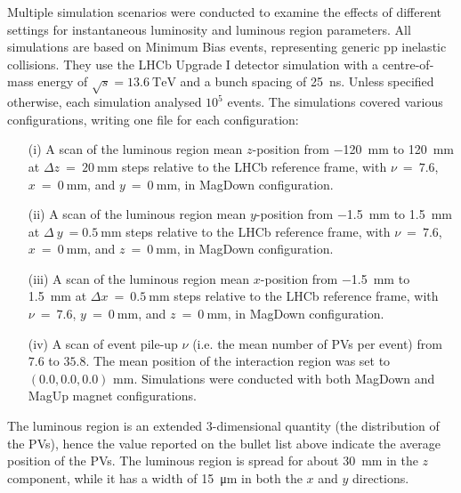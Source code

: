 Multiple simulation scenarios were conducted to examine the effects of different settings for instantaneous luminosity and luminous region parameters. All simulations are based on Minimum Bias events, representing generic pp inelastic collisions. They use the LHCb Upgrade I detector simulation with a centre-of-mass energy of $\sqrt{s} = \SI{13.6}{\tera\eV}$ and a bunch spacing of \SI{25}{\nano\second}. Unless specified otherwise, each simulation analysed $10^5$ events. The simulations covered various configurations, writing one file for each configuration:

\begin{enumerate}

    \item[(i)] A scan of the luminous region mean $z$-position from \SI{-120}{\milli\meter} to \SI{120}{\milli\meter} at $\Delta z~=~\SI{20}{\milli\meter}$ steps relative to the LHCb reference frame, with $\nu~=~7.6$, $x~=~\SI{0}{\milli\meter}$, and $y~=~\SI{0}{\milli\meter}$, in MagDown configuration.

    \item[(ii)] A scan of the luminous region mean $y$-position from \SI{-1.5}{\milli\meter} to \SI{1.5}{\milli\meter} at $\Delta~y~=\SI{0.5}{\milli\meter}$ steps relative to the LHCb reference frame, with $\nu~=~7.6$, $x~=~\SI{0}{\milli\meter}$, and $z~=~\SI{0}{\milli\meter}$, in MagDown configuration.

     \item[(iii)] A scan of the luminous region mean $x$-position from \SI{-1.5}{\milli\meter} to \SI{1.5}{\milli\meter} at $\Delta x~=~\SI{0.5}{\milli\meter}$ steps relative to the LHCb reference frame, with $\nu~=~7.6$, $y~=~\SI{0}{\milli\meter}$, and $z~=~\SI{0}{\milli\meter}$, in MagDown configuration.

     \item[(iv)] A scan of event pile-up $\nu$ (i.e. the mean number of PVs per event) from $7.6$ to $35.8$. The mean position of the interaction region was set to $(0.0, 0.0, 0.0)$ mm. Simulations were conducted with both MagDown and MagUp magnet configurations.

\end{enumerate}


The luminous region is an extended 3-dimensional quantity (the distribution of the PVs), hence the value reported on the bullet list above indicate the average position of the PVs. The luminous region is spread for about \SI{30}{\milli\meter} in the $z$ component, while it has a width of \SI{15}{\micro\meter} in both the $x$ and $y$ directions.  


